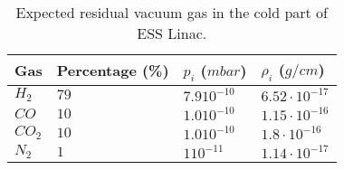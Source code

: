 \begin{table}[ht]
	\centering
	\caption[Expected residual vacuum gas in the cold part of ESS Linac]
	{Expected residual vacuum gas in the cold part of ESS Linac.}
	\label{chap3:ess_vacuum_gas}
	\begin{tabular}{llll}
		\toprule
		Gas        & Percentage (\%) & $p_{i}$ (\(mbar\)) & $\rho_{i}$ (\(g/cm\)) \\
		\midrule
		\(H_{2}\)  & \(79\)          & \(7.9 10^{-10}\)   & \(6.52\cdot
		10^{-17}\)                                                                \\
		\(CO\)     & \(10\)          & \(1.0 10^{-10}\)   & \(1.15\cdot
		10^{-16}\)                                                                \\
		\(CO_{2}\) & \(10\)          & \(1.0 10^{-10}\)   & \(1.8\cdot
		10^{-16}\)                                                                \\
		\(N_{2}\)  & \(1\)           & \(1 10^{-11}\)     & \(1.14\cdot
		10^{-17}\)                                                                \\
		\bottomrule
	\end{tabular}
\end{table}